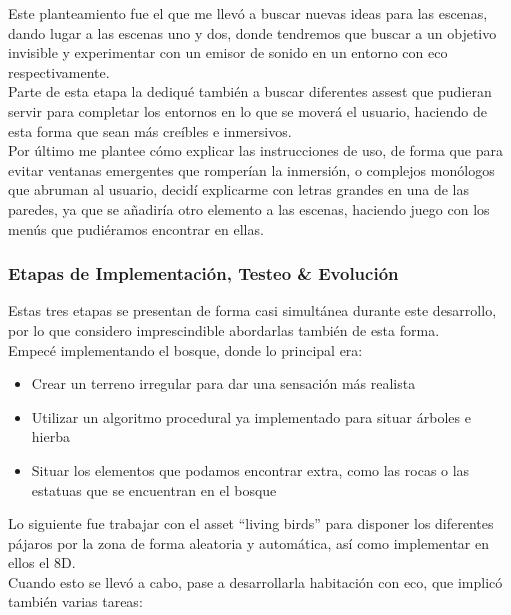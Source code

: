\quad Este planteamiento fue el que me llevó a buscar nuevas ideas para las escenas, dando lugar a las escenas uno y dos, donde tendremos que buscar a un objetivo invisible y experimentar con un emisor de sonido en un entorno con eco respectivamente.\\

\quad Parte de esta etapa la dediqué también a buscar diferentes assest que pudieran servir para completar los entornos en lo que se moverá el usuario, haciendo de esta forma que sean más creíbles e inmersivos.\\

\quad Por último me plantee cómo explicar las instrucciones de uso, de forma que para evitar ventanas emergentes que romperían la inmersión, o complejos monólogos que abruman al usuario, decidí explicarme con letras grandes en una de las paredes, ya que se añadiría otro elemento a las escenas, haciendo juego con los menús que pudiéramos encontrar en ellas.\\

\subsubsection{Etapas de Implementación, Testeo \& Evolución} 

\quad Estas tres etapas se presentan de forma casi simultánea durante este desarrollo, por lo que considero imprescindible abordarlas también de esta forma.\\

\quad Empecé implementando el bosque, donde lo principal era:

\begin{itemize}
	\item Crear un terreno irregular para dar una sensación más realista
	\item Utilizar un algoritmo procedural ya implementado para situar árboles e hierba
	\item Situar los elementos que podamos encontrar extra, como las rocas o las estatuas que se encuentran en el bosque
\end{itemize}

\quad Lo siguiente fue trabajar con el asset “living birds” para disponer los diferentes pájaros por la zona de forma aleatoria y automática, así como implementar en ellos el 8D.\\

\quad Cuando esto se llevó a cabo, pase a desarrollarla habitación con eco, que implicó también varias tareas:
 
